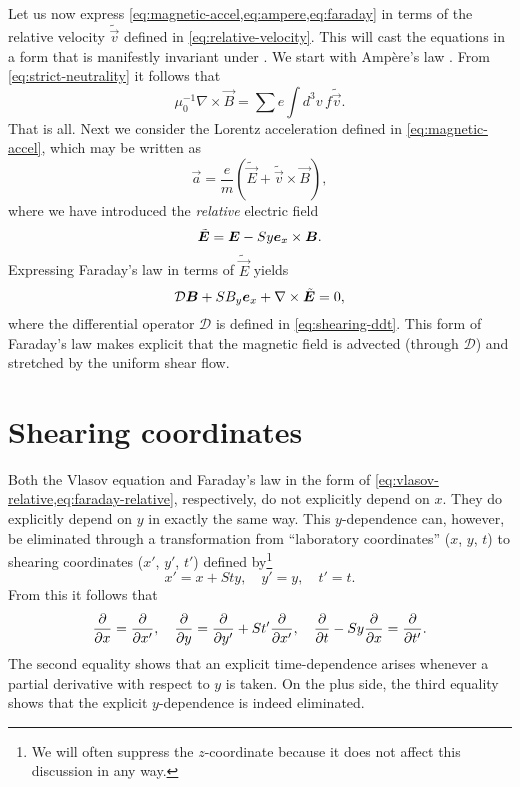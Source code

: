 \documentclass[aps,pre,notitlepage,amsmath,amssymb,amsfonts,nobibnotes,nofootinbib,superscriptaddress,onecolumn,a4paper,10pt]{revtex4-1}
\newcommand{\tvec}[1]{\tilde{\vec{#1}}}
\begin{document}
Let us now express \cref{eq:magnetic-accel,eq:ampere,eq:faraday} in terms of
the relative velocity $\tvec{v}$ defined in \cref{eq:relative-velocity}. This
will cast the equations in a form that is manifestly invariant under
. We start with Ampère's law
. From \cref{eq:strict-neutrality} it follows that
\begin{equation}
  \mu_0^{-1}\nabla\times\vec{B} = \sum e\int\!d^3v\,f\tvec{v}.
\end{equation}
That is all. Next we consider the Lorentz acceleration defined in
\cref{eq:magnetic-accel}, which may be written as
\begin{equation}
  \vec{a} = \frac{e}{m}(\tvec{E} + \tvec{v}\times\vec{B}),
\end{equation}
where we have introduced the \emph{relative} electric field
\begin{equation}
  \tvec{E} = \vec{E} - Sy\ex\times\vec{B}.
\end{equation}
Expressing Faraday's law  in terms of $\tvec{E}$ yields
\begin{equation}
  \label{eq:faraday-relative}
  \mathcal{D}\vec{B} + SB_y\ex + \nabla\times\tvec{E} = 0,
\end{equation}
where the differential operator $\mathcal{D}$ is defined in
\cref{eq:shearing-ddt}. This form of Faraday's law makes explicit that the
magnetic field is advected (through $\mathcal{D}$) and stretched by the
uniform shear flow.

\section{Shearing coordinates}\label{sec:shearing-coordinates}

Both the Vlasov equation and Faraday's law in the form of
\cref{eq:vlasov-relative,eq:faraday-relative}, respectively, do not explicitly
depend on $x$. They do explicitly depend on $y$ in exactly the same way. This
$y$-dependence can, however, be eliminated through a transformation from
``laboratory coordinates'' ($x$, $y$, $t$) to shearing coordinates ($x'$,
$y'$, $t'$) defined by\footnote{We will often suppress the $z$-coordinate
  because it does not affect this discussion in any way.}
\begin{equation}
  \label{eq:shearing-coordinates}
  x' = x + Sty,\quad y' = y,\quad t' = t.
\end{equation}
From this it follows that
\begin{equation}
  \frac{\partial}{\partial x} = \frac{\partial}{\partial x'},\quad
  \frac{\partial}{\partial y} = \frac{\partial}{\partial y'} + St'\frac{\partial}{\partial x'},\quad
  \frac{\partial}{\partial t} - Sy\frac{\partial}{\partial x} = \frac{\partial}{\partial t'}.
\end{equation}
The second equality shows that an explicit time-dependence arises whenever a
partial derivative with respect to $y$ is taken. On the plus side, the third
equality shows that the explicit $y$-dependence is indeed eliminated.
\end{document}
